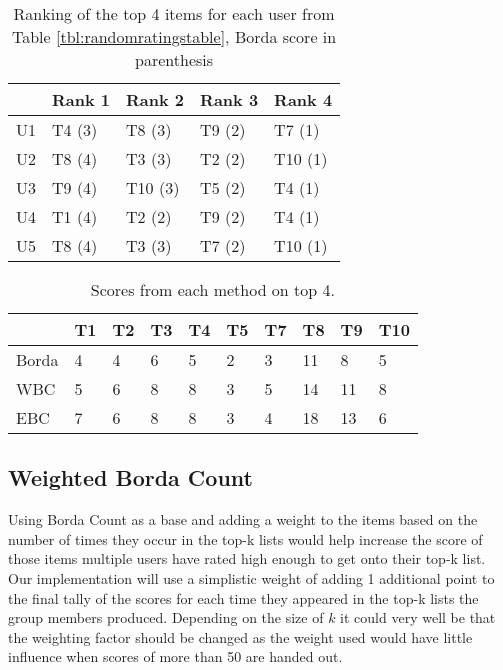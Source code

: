 \begin{table}[H]
	\centering
	\begin{tabular}{l|l|l|l|l|}
		\cline{2-5}
		& Rank 1 & Rank 2 & Rank 3 & Rank 4 \\ \hline
		\multicolumn{1}{|l|}{U1} & T4 (3) & T8 (3) & T9 (2) & T7 (1) \\ \hline
		\multicolumn{1}{|l|}{U2} & T8 (4) & T3 (3) & T2 (2) & T10 (1) \\ \hline
		\multicolumn{1}{|l|}{U3} & T9 (4) & T10 (3) & T5 (2) & T4 (1) \\ \hline
		\multicolumn{1}{|l|}{U4} & T1 (4) & T2 (2) & T9 (2) & T4 (1) \\ \hline
		\multicolumn{1}{|l|}{U5} & T8 (4) & T3 (3) & T7 (2) & T10 (1) \\ \hline
	\end{tabular}
	\caption{Ranking of the top 4 items for each user from Table \ref{tbl:randomratingstable}, Borda score in parenthesis }
	\label{tbl:top4borda}
\end{table}

\begin{table}[H]
	\centering
	\begin{tabular}{l|l|l|l|l|l|l|l|l|l|}
		\cline{2-10}
		& T1 & T2 & T3 & T4 & T5 & T7 & T8 & T9 & T10 \\ \hline
		\multicolumn{1}{|l|}{Borda} & 4 & 4 & 6 & 5 & 2 & 3 & 11 & 8 & 5 \\ \hline
		\multicolumn{1}{|l|}{WBC} & 5 & 6 & 8 & 8 & 3 & 5 & 14 & 11 & 8 \\ \hline
		\multicolumn{1}{|l|}{EBC} & 7 & 6 & 8 & 8 & 3 & 4 & 18 & 13 & 6 \\ \hline
	\end{tabular}
	\caption{Scores from each method on top 4.}
	\label{tbl:novelscoresexample}
\end{table}

\subsection{Weighted Borda Count}
Using Borda Count as a base and adding a weight to the items based on the number of times they occur in the top-k lists would help increase the score of those items multiple users have rated high enough to get onto their top-k list. Our implementation will use a simplistic weight of adding 1 additional point to the final tally of the scores for each time they appeared in the top-k lists the group members produced. Depending on the size of $k$ it could very well be that the weighting factor should be changed as the weight used would have little influence when scores of more than 50 are handed out.




